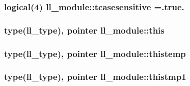 \subsubsection[{tcasesensitive}]{\setlength{\rightskip}{0pt plus 5cm}logical(4) ll\+\_\+module\+::tcasesensitive =.true.}\label{namespacell__module_a162ab75decc0d5fc590e2bebe645c50f}
\hypertarget{namespacell__module_a783da1e4daa9a59c867f3b4c7bcc4c40}{}
\subsubsection[{this}]{\setlength{\rightskip}{0pt plus 5cm}type({\bf ll\+\_\+type}), pointer ll\+\_\+module\+::this}\label{namespacell__module_a783da1e4daa9a59c867f3b4c7bcc4c40}
\hypertarget{namespacell__module_abbd7e613a1a01cdf243759df306a5c74}{}
\subsubsection[{thistemp}]{\setlength{\rightskip}{0pt plus 5cm}type({\bf ll\+\_\+type}), pointer ll\+\_\+module\+::thistemp}\label{namespacell__module_abbd7e613a1a01cdf243759df306a5c74}
\hypertarget{namespacell__module_adff084d143c069989dfc42f647ae5d4a}{}
\subsubsection[{thistmp1}]{\setlength{\rightskip}{0pt plus 5cm}type({\bf ll\+\_\+type}), pointer ll\+\_\+module\+::thistmp1}\label{namespacell__module_adff084d143c069989dfc42f647ae5d4a}
